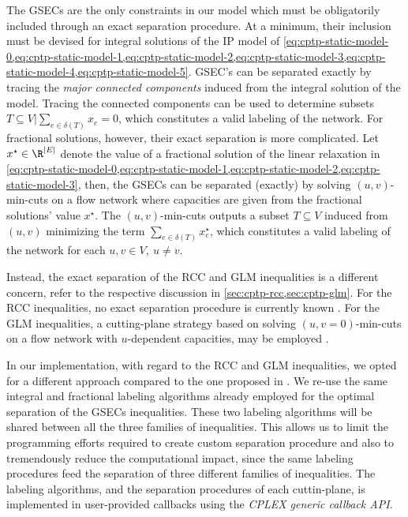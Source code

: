 The GSECs are the only constraints in our model which must be obligatorily
included through an exact separation procedure.
At a minimum, their inclusion must be devised
for integral solutions of the IP model of
\cref{eq:cptp-static-model-0,eq:cptp-static-model-1,eq:cptp-static-model-2,eq:cptp-static-model-3,eq:cptp-static-model-4,eq:cptp-static-model-5}.
GSEC's can be separated exactly
by tracing the \textit{major connected components}
induced from the integral solution of the model.
Tracing the connected components can be used to determine subsets
$T \subseteq V | \sum_{e \in \delta(T)} x_e = 0$,
which constitutes a valid labeling of the network.
For fractional solutions, however, their exact separation is more complicated.
Let $x^\star \in \R^{|E|}$ denote the value of a fractional solution of
the linear relaxation in
\cref{eq:cptp-static-model-0,eq:cptp-static-model-1,eq:cptp-static-model-2,eq:cptp-static-model-3},
then,
the GSECs can be separated (exactly) by solving $(u, v)$-min-cuts
on a flow network where capacities are given from the fractional solutions' value $x^\star$.
The $(u, v)$-min-cuts outputs a subset $T \subseteq V$ induced from $(u, v)$
minimizing the term $\sum_{e \in \delta(T)} x^\star_e$,
which constitutes a valid labeling of the network for each $u, v \in V,\ u \ne v$.

Instead, the exact separation of the RCC and GLM inequalities
is a different concern, refer to the respective discussion in \cref{sec:cptp-rcc,sec:cptp-glm}.
For the RCC inequalities,
no exact separation procedure is currently known \parencite{jepsen2014}.
For the GLM inequalities,
a cutting-plane strategy based on solving
$(u, v=0)$-min-cuts on a flow network with $u$-dependent capacities,
may be employed \parencite{letchford2006, jepsen2014}.

\medskip

In our implementation, with regard to the RCC and GLM inequalities,
we opted for a different approach compared to the one proposed in \textcite{jepsen2014}.
We re-use the same integral and fractional labeling algorithms
already employed for the optimal separation of the GSECs inequalities.
These two labeling algorithms will be shared between all the three families of inequalities.
This allows us to limit the programming efforts required to create custom
separation procedure
and also to tremendously reduce the computational impact,
since the same labeling procedures feed the separation of three different families of inequalities.
The labeling algorithms, and the separation procedures of each cuttin-plane,
is implemented in user-provided callbacks using the \textit{CPLEX generic callback API}.

